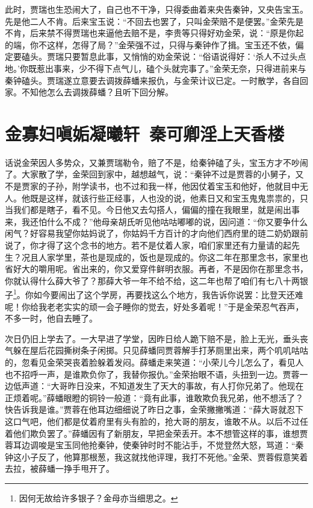 \documentclass[12pt,oneside]{book}
\begin{document}
此时，贾瑞也生恐闹大了，自己也不干净，只得委曲着来央告秦钟，又央告宝玉。先是他二人不肯。后来宝玉说：“不回去也罢了，只叫金荣赔不是便罢。”金荣先是不肯，后来禁不得贾瑞也来逼他去赔不是，李贵等只得好劝金荣，说：“原是你起的端，你不这样，怎得了局？”金荣强不过，只得与秦钟作了揖。宝玉还不依，偏定要磕头。贾瑞只要暂息此事，又悄悄的劝金荣说：“俗语说得好：‘杀人不过头点地。’你既惹出事来，少不得下点气儿，磕个头就完事了。”金荣无奈，只得进前来与秦钟磕头。贾瑞遂立意要去调拨薛蟠来报仇，与金荣计议已定。一时散学，各自回家。不知他怎么去调拨薛蟠？且听下回分解。



\chapter{金寡妇嗔姤凝曦轩~秦可卿淫上天香楼}
话说金荣因人多势众，又兼贾瑞勒令，赔了不是，给秦钟磕了头，宝玉方才不吵闹了。大家散了学，金荣回到家中，越想越气，说：“秦钟不过是贾蓉的小舅子，又不是贾家的子孙，附学读书，也不过和我一样，他因仗着宝玉和他好，他就目中无人。他既是这样，就该行些正经事，人也没的说，他素日又和宝玉鬼鬼祟祟的，只当我们都是瞎子，看不见。今日他又去勾搭人，偏偏的撞在我眼里，就是闹出事来，我还怕什么不成？”他母亲胡氏听见他咕咕嘟嘟的说，因问道：“你又要争什么闲气？好容易我望你姑妈说了，你姑妈千方百计的才向他们西府里的琏二奶奶跟前说了，你才得了这个念书的地方。若不是仗着人家，咱们家里还有力量请的起先生？况且人家学里，茶也是现成的，饭也是现成的。你这二年在那里念书，家里也省好大的嚼用呢。省出来的，你又爱穿件鲜明衣服。再者，不是因你在那里念书，你就认得什么薛大爷了？那薛大爷一年不给不给，这二年也帮了咱们有七八十两银子\footnote{因何无故给许多银子？金母亦当细思之。}。你如今要闹出了这个学房，再要找这么个地方，我告诉你说罢：比登天还难呢！你给我老老实实的顽一会子睡你的觉去，好处多着呢！”于是金荣忍气吞声，不多一时，他自去睡了。

次日仍旧上学去了。一大早进了学堂，因昨日给人跪下赔不是，脸上无光，垂头丧气躲在屋后花园撕树条子闲掷。只见薛蟠同贾蓉解手打茅厕里出来，两个叽叽咕咕的，忽看见金荣哭丧着脸躲着发闷。薛蟠走来笑道：“小荣儿今儿怎么了，看见人也不招呼一声，是谁欺负你了，我替你报仇。”金荣抬眼不语，头扭到一边。贾蓉一边低声道：“大哥昨日没来，不知道发生了天大的事故，有人打你兄弟了。他现在正烦着呢。”薛蟠眼瞪的铜铃一般道：“竟有此事，谁敢欺负我兄弟，他不想活了？快告诉我是谁。”贾蓉在他耳边细细说了昨日之事，金荣撇撇嘴道：“薛大哥就忍下这口气吧，他们都是仗着府里有头有脸的，抢大哥的朋友，谁敢不从。以后不过任着他们欺负罢了。”薛蟠因有了新朋友，早把金荣丢开。本不想管这样的事，谁想贾蓉耳边调唆是宝玉同他抢秦钟，使秦钟时时不能沾手，不觉登然大怒，骂道：“秦钟这小子反了，他算那根葱，我这就找他评理，我打不死他。”金荣、贾蓉假意笑着去拉，被薛蟠一挣手甩开了。
\end{document}
